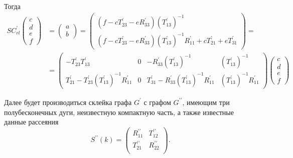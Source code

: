 \documentclass[a4 paper, 12 pt]{extarticle}
\begin{document}
   Тогда
   \[
   \begin{aligned}
   SC_{rl}^\prime\left(
   \begin{array}{c}
   c \\
   d \\
   e \\
   f
   \end{array}\right) &= \left(\begin{array}{c}
   a \\
   b
   \end{array}\right) = 
   \left(\begin{array}{c}
   \left(f - cT_{23}^\prime - eR_{33}^\prime\right)\left(T_{13}^\prime\right)^{-1} \\
   \left(f - cT_{23}^\prime - eR_{33}^\prime\right)\left(T_{13}^\prime\right)^{-1}R_{11}^\prime + cT_{21}^\prime + eT_{31}^\prime
   \end{array}\right) =\\
   &= \left(\begin{array}{cccc}
   -T_{23}^\prime T_{13}^\prime & 0 & -R_{33}^\prime \left(T_{13}^\prime\right)^{-1} & \left(T_{13}^\prime\right)^{-1} \\
   T_{21}^\prime- T_{23}^\prime\left(T_{13}^\prime\right)^{-1}R_{11}^\prime & 0 & T_{31}^\prime - R_{33}^\prime \left(T_{13}^\prime\right)^{-1}R_{11}^\prime & \left(T_{13}^\prime\right)^{-1}R_{11}^\prime
   \end{array}\right)
   \left(\begin{array}{c}
   c \\
   d \\
   e \\
   f
   \end{array}\right)
   \end{aligned}\]
   
   Далее будет производиться склейка графа $G^\prime$ с графом $G^{\prime\prime}$, имеющим три полубесконечных дуги, неизвестную компактную часть, а также известные данные рассеяния 
   \[
   S^{\prime\prime}(k)=\left(%
   \begin{array}{cc}
   R_{11}^{\prime\prime} & T_{12}^{\prime\prime} \\
   T_{21}^{\prime\prime} & R_{22}^{\prime\prime} \\
   \end{array}%
   \right).
   \]
   
\end{document}
